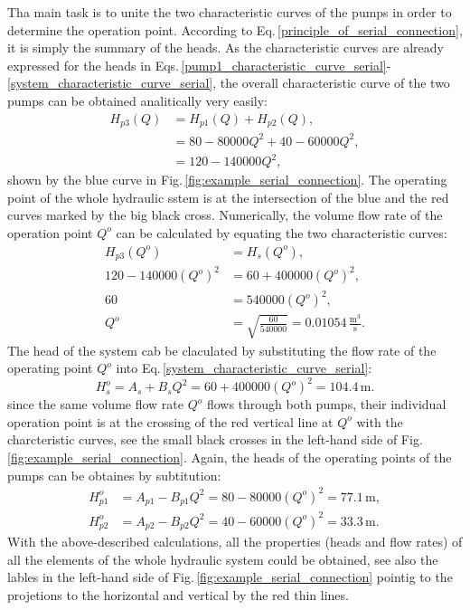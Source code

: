 Tha main task is to unite the two characteristic curves of the pumps in order to determine the operation point. According to Eq.\,\eqref{principle_of_serial_connection}, it is simply the summary of the heads. As the characteristic curves are already expressed for the heads in Eqs.\,\eqref{pump1_characteristic_curve_serial}-\eqref{system_characteristic_curve_serial}, the overall characteristic curve of the two pumps can be obtained analitically very easily:
%
\begin{equation}
\begin{split}
H_{p3}(Q) &= H_{p1}(Q) + H_{p2}(Q), \\
          &= 80 - 80000 Q^2 + 40 - 60000 Q^2, \\
		  &= 120 - 140000 Q^2,
\end{split}
\end{equation}
%
shown by the blue curve in Fig.\,\ref{fig:example_serial_connection}. The operating point of the whole hydraulic sstem is at the intersection of the blue and the red curves marked by the big black cross. Numerically, the volume flow rate of the operation point $Q^o$ can be calculated by equating the two characteristic curves:
%
\begin{equation}
\begin{split}
         H_{p3}(Q^o) &= H_{s}(Q^o), \\
120 - 140000 (Q^o)^2 &= 60 + 400000 (Q^o)^2, \\
		          60 &= 540000 (Q^o)^2, \\
			     Q^o &= \sqrt{\frac{60}{540000}} = 0.01054\,\mathrm{\frac{m^3}{s}}.
\end{split}
\end{equation}
%
The head of the system cab be claculated by substituting the flow rate of the operating point $Q^o$ into Eq.\,\eqref{system_characteristic_curve_serial}:
%
\begin{equation} \label{principle_of_serial_connection}
H_s^o = A_s + B_s Q^2 = 60 + 400000 (Q^o)^2 = 104.4\,\mathrm{m}.
\end{equation}
%
since the same volume flow rate $Q^o$ flows through both pumps, their individual operation point is at the crossing of the red vertical line at $Q^o$ with the charcteristic curves, see the small black crosses in the left-hand side of Fig.\,\ref{fig:example_serial_connection}. Again, the heads of the operating points of the pumps can be obtaines by subtitution:
%
\begin{align}
H_{p1}^o &= A_{p1} - B_{p1} Q^2 = 80 - 80000 (Q^o)^2 = 77.1\,\mathrm{m}, \\
H_{p2}^o &= A_{p2} - B_{p2} Q^2 = 40 - 60000 (Q^o)^2 = 33.3\,\mathrm{m}.
\end{align}
%
With the above-described calculations, all the properties (heads and flow rates) of all the elements of the whole hydraulic system could be obtained, see also the lables in the left-hand side of Fig.\,\ref{fig:example_serial_connection} pointig to the projetions to the horizontal and vertical by the red thin lines.


